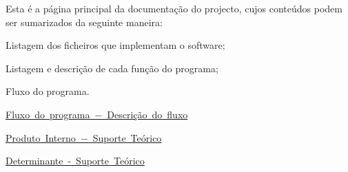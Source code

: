 Esta é a página principal da documentação do projecto, cujos conteúdos podem ser sumarizados da seguinte maneira\+:


\begin{DoxyEnumerate}
\item Listagem dos ficheiros que implementam o software;
\item Listagem e descrição de cada função do programa;
\item Fluxo do programa.
\end{DoxyEnumerate}

\mbox{\hyperlink{workflow}{Fluxo do programa − Descrição do fluxo}}

\mbox{\hyperlink{teoria}{Produto Interno − Suporte Teórico}}

\mbox{\hyperlink{teoria1}{Determinante -\/ Suporte Teórico}} 